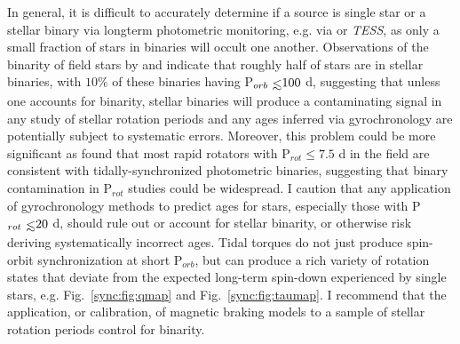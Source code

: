 In general, it is difficult to accurately determine if a source is single star or a stellar binary via longterm photometric monitoring, e.g. via \kepler or \textit{TESS}, as only a small fraction of stars in binaries will occult one another. Observations of the binarity of field stars by \citet{Raghavan2010} and \citet{Duchene2013} indicate that roughly half of stars are in stellar binaries, with $10\%$ of these binaries having P$_{orb} \lsim 100$ d, suggesting that unless one accounts for binarity, stellar binaries will produce a contaminating signal in any study of stellar rotation periods and any ages inferred via gyrochronology are potentially subject to systematic errors.  Moreover, this problem could be more significant as \citet{Simonian2018} found that most rapid rotators with P$_{rot} \leq 7.5$ d in the \kepler field are consistent with tidally-synchronized photometric binaries, suggesting that binary contamination in P$_{rot}$ studies could be widespread. I caution that any application of gyrochronology methods to predict ages for stars, especially those with P$_{rot} \lsim 20$ d, should rule out or account for stellar binarity, or otherwise risk deriving systematically incorrect ages. Tidal torques do not just produce spin-orbit synchronization at short P$_{orb}$, but can produce a rich variety of rotation states that deviate from the expected long-term spin-down experienced by single stars, e.g. Fig.~\ref{sync:fig:qmap} and Fig.~\ref{sync:fig:taumap}. I recommend that the application, or calibration, of magnetic braking models to a sample of stellar rotation periods control for binarity.   




